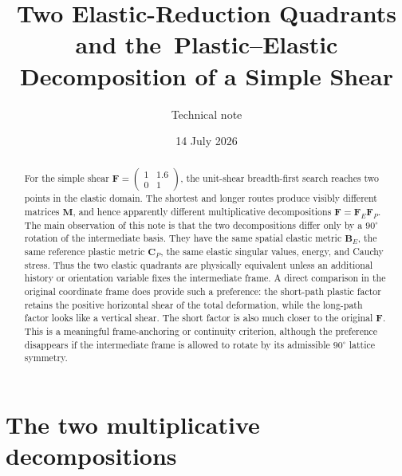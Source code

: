 \documentclass[11pt]{article}
\title{Two Elastic-Reduction Quadrants and the\
Plastic--Elastic Decomposition of a Simple Shear}
\author{Technical note}
\date{14 July 2026}
\begin{document}
\maketitle

\begin{abstract}
For the simple shear
\(
 \mathbf F=\left(\begin{smallmatrix}1&1.6\\0&1\end{smallmatrix}\right)
\), the unit-shear breadth-first search reaches two points in the elastic
domain.  The shortest and longer routes produce visibly different matrices
\(\mathbf M\), and hence apparently different multiplicative decompositions
\(\mathbf F=\mathbf F_E\mathbf F_P\).  The main observation of this note is
that the two decompositions differ only by a $90^\circ$ rotation of the
intermediate basis.  They have the same spatial elastic metric
\(\mathbf B_E\), the same reference plastic metric \(\mathbf C_P\), the same
elastic singular values, energy, and Cauchy stress.  Thus the two elastic
quadrants are physically equivalent unless an additional history or
orientation variable fixes the intermediate frame.  A direct comparison in
the original coordinate frame does provide such a preference: the short-path
plastic factor retains the positive horizontal shear of the total
deformation, while the long-path factor looks like a vertical shear.  The
short factor is also much closer to the original \(\mathbf F\).  This is a
meaningful frame-anchoring or continuity criterion, although the preference
disappears if the intermediate frame is allowed to rotate by its admissible
$90^\circ$ lattice symmetry.
\end{abstract}

\section{The two multiplicative decompositions}
\end{document}
